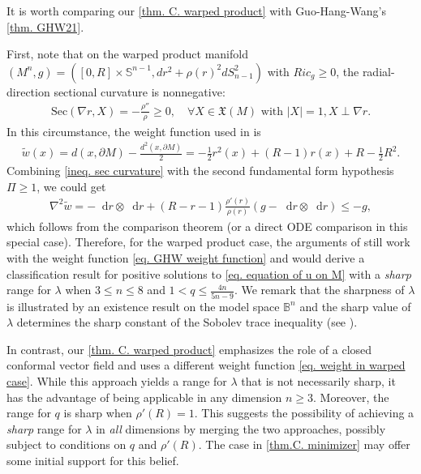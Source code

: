 \documentclass[12pt]{amsart}%
\numberwithin{equation}{section}
\numberwithin{lemma}{section}
\numberwithin{proposition}{section}
\numberwithin{corollary}{section}
\numberwithin{remark}{section}
\newcommand{\dd}{\mathop{}\!\mathrm{d}}%
\begin{document}
It is worth comparing our \cref{thm. C. warped product} with Guo-Hang-Wang's \cref{thm. GHW21}.

First, note that on the warped product manifold $(M^n,g)=([0,R]\times \mathbb{S}^{n-1},dr^2+\rho(r)^2dS_{n-1}^2)$ with $Ric_g\geq 0$, the radial-direction sectional curvature is nonnegative:
\begin{align}\label{ineq. sec curvature}
    \mathrm{Sec}(\nabla r,X)=-\frac{\rho''}{\rho}\geq 0,
    \quad \forall X\in \mathfrak{X}(M)
    \text{ with } |X|=1, X\perp \nabla r.
\end{align}
In this circumstance, the weight function used in \cite{GHW21} is
\begin{align}\label{eq. GHW weight function}
    \tilde{w}(x)
    =d(x,\partial M)-\frac{d^2(x,\partial M)}{2}
    =-\frac{1}{2}r^2(x)+(R-1)r(x)+R-\frac{1}{2}R^2.
\end{align}
Combining \cref{ineq. sec curvature} with the second fundamental form hypothesis $\Pi\geq 1$, we could get
\begin{align*}
    \nabla^2 \tilde{w}=-\dd r\otimes \dd r+(R-r-1)\frac{\rho'(r)}{\rho(r)}(g-\dd r\otimes \dd r)
    \leq -g,
\end{align*}
which follows from the comparison theorem \cite[Theorem 2.31]{Kas82} (or a direct ODE comparison in this special case). Therefore, for the warped product case,  the arguments of \cite{GHW21} still work with the weight function \cref{eq. GHW weight function} and would derive a classification result for positive solutions to \cref{eq. equation of u on M} with a \emph{sharp} range for $\lambda$ when $3\leq n\leq 8$ and $1<q\leq \frac{4n}{5n-9}$. We remark that the sharpness of $\lambda$ is illustrated by an existence result on the model space $\mathbb{B}^n$ \cite[Proposition 1]{GHW21} and the sharp value of $\lambda$ determines the sharp constant of the Sobolev trace inequality (see \cite[Corollary 1]{GHW21}).

In contrast, our \cref{thm. C. warped product} emphasizes the role of a closed conformal vector field and uses a different weight function \cref{eq. weight in warped case}. While this approach yields a range for $\lambda$ that is not necessarily sharp, it has the advantage of being applicable in any dimension $n\geq 3$. Moreover, the range for $q$ is sharp when $\rho'(R)=1$.
 This suggests the possibility of achieving a \emph{sharp} range for $\lambda$ in \emph{all} dimensions by merging the two approaches, possibly subject to conditions on
 $q$ and $\rho'(R)$. 
 The case in \cref{thm.C. minimizer} may offer some initial support for this  belief.
\end{document}
